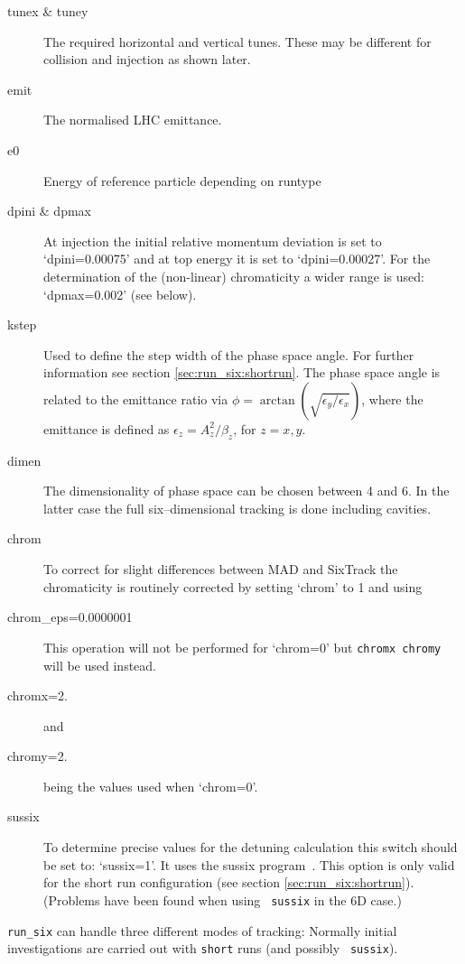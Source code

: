 \documentclass{cernatsnote}
\begin{document}
\begin{description}
\item [tunex \& tuney] The required horizontal and vertical tunes.
These may be different for collision and injection as shown later.
\item [emit] The normalised LHC emittance.
\item [e0] Energy of reference particle depending on runtype
\item [dpini \& dpmax]
  At injection the initial relative momentum deviation is set to
  `dpini=0.00075' and at top energy it is set to `dpini=0.00027'.
  For the determination of the (non-linear) chromaticity a wider range is used:
  `dpmax=0.002' (see below).
\item [kstep]
  Used to define the step width of the phase space angle. For further
  information see section \ref{sec:run_six:shortrun}. The phase space angle is
  related to the emittance ratio via
  $\phi=\arctan\left(\sqrt{{\epsilon_y}/{\epsilon_x}}\right)$, where the
  emittance is defined as $\epsilon_z=A_z^2/\beta_z$, for $z=x,y$.
\item [dimen]
  The dimensionality of phase space can be chosen between 4 and 6. In the
  latter case the full six--dimensional tracking is done including cavities.
\item [chrom]
  To correct for slight differences between MAD and SixTrack the chromaticity
  is routinely corrected by setting `chrom' to 1 and using
\item[chrom\_eps=0.0000001] This operation will not be performed for `chrom=0'
  but \texttt{chromx chromy} will be used instead.
\item[chromx=2.] and
\item[chromy=2.] being the values used when `chrom=0'.
\item [sussix]
  To determine precise values for the detuning calculation this switch should
  be set to: `sussix=1'. It uses the sussix program~\cite{lines3}. This option
  is only valid for the short run configuration (see section
  \ref{sec:run_six:shortrun}).  (Problems have been found when using {\tt
  sussix} in the 6D case.)
\end{description}

\texttt{run\_six} can handle three different modes of tracking: Normally initial
investigations are carried out with \texttt{short} runs (and possibly {\tt
sussix}).
\end{document}
